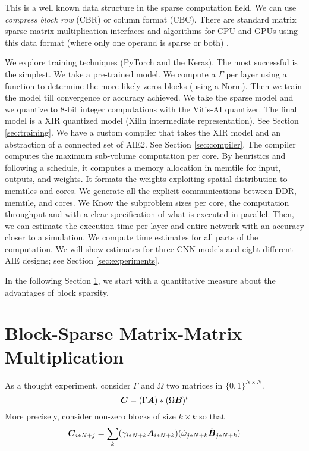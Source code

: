 \documentclass[sigconf]{acmart}
\begin{document}
This is a well known data structure in the sparse computation field.
We can use {\em compress block row} (CBR) or {\em }column format
(CBC). There are standard matrix sparse-matrix multiplication
interfaces and algorithms for CPU and GPUs using this data format
(where only one operand is sparse or both) \cite{rocSPARSE,cuSPARSE}.

We explore training techniques (PyTorch and the Keras).  The most
successful is the simplest. We take a pre-trained model. We compute a
$\Gamma$ per layer using a function to determine the more likely zeros
blocks (using a Norm). Then we train the model till convergence or
accuracy achieved. We take the sparse model and we quantize to 8-bit
integer computations with the Vitis-AI quantizer. The final model is a
XIR quantized model (Xilin intermediate representation). See Section
\ref{sec:training}. We have a custom compiler that takes the XIR model
and an abstraction of a connected set of AIE2. See Section
\ref{sec:compiler}. The compiler computes the maximum sub-volume
computation per core. By heuristics and following a schedule, it
computes a memory allocation in memtile for input, outputs, and
weights. It formats the weights exploiting spatial distribution to
memtiles and cores. We generate all the explicit communications
between DDR, memtile, and cores. We Know the subproblem sizes per
core, the computation throughput and with a clear specification of
what is executed in parallel. Then, we can estimate the execution time
per layer and entire network with an accuracy closer to a simulation.
We compute time estimates for all parts of the computation. We will
show estimates for three CNN models and eight different AIE designs;
see Section \ref{sec:experiments}.

In the following Section \ref{sec:motivation}, we start with a
quantitative measure about the advantages of block sparsity.

\section{Block-Sparse Matrix-Matrix Multiplication}
\label{sec:motivation}

As a thought experiment, consider $\Gamma$ and $\Omega$ two matrices
in $\{0,1\}^{N\times N}$.
\begin{equation}
  {\boldsymbol C} = (\Gamma {\boldsymbol A}) * (\Omega {\boldsymbol B})^t
\end{equation}
More precisely, consider non-zero blocks of size $k\times k$ so that
\begin{equation}
  {\boldsymbol C}_{i*N+j} = \sum_k ( \gamma_{i*N+k} {\boldsymbol A}_{i*N+k} ) (\dot{\omega}_{j*N+k} \dot{{\boldsymbol B}}_{j*N+k})
\end{equation}
\end{document}
